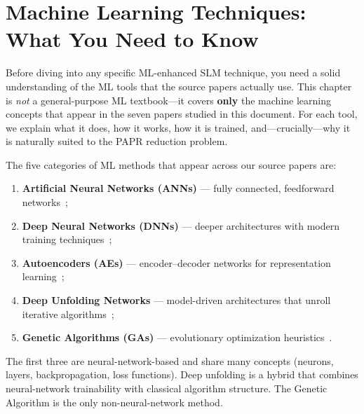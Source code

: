 \chapter{Machine Learning Techniques: What You Need to Know}
\label{ch:ml_techniques}

\begin{motivation}
    Before diving into any specific ML-enhanced SLM technique, you need a
    solid understanding of the ML tools that the source papers actually use.
    This chapter is \emph{not} a general-purpose ML textbook---it covers
    \textbf{only} the machine learning concepts that appear in the seven
    papers studied in this document.  For each tool, we explain what it does,
    how it works, how it is trained, and---crucially---why it is naturally
    suited to the PAPR reduction problem.
\end{motivation}

The five categories of ML methods that appear across our source papers are:
\begin{enumerate}
    \item \textbf{Artificial Neural Networks (ANNs)} — fully connected,
          feedforward networks~\cite{da2024survey,zou2021novel};
    \item \textbf{Deep Neural Networks (DNNs)} — deeper architectures
          with modern training techniques~\cite{da2024survey,kim2017novel};
    \item \textbf{Autoencoders (AEs)} — encoder--decoder networks for
          representation learning~\cite{kim2017novel,hao2019extended,alnaseri2025deep};
    \item \textbf{Deep Unfolding Networks} — model-driven architectures
          that unroll iterative algorithms~\cite{nguyen2022deep};
    \item \textbf{Genetic Algorithms (GAs)} — evolutionary optimization
          heuristics~\cite{ali2016new}.
\end{enumerate}

The first three are neural-network-based and share many concepts (neurons,
layers, backpropagation, loss functions).  Deep unfolding is a hybrid that
combines neural-network trainability with classical algorithm structure.
The Genetic Algorithm is the only non-neural-network method.


